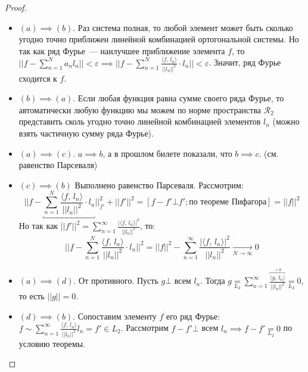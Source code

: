\begin{proof}~
    \begin{itemize}
        \item $(a) \implies (b)$. Раз система полная, то любой элемент может быть сколько угодно точно приближен линейной комбинацией ортогональной системы. Но так как ряд Фурье~--- наилучшее приближение элемента $f$, то $\lvert \lvert f - \sum_{n=1}^N a_n l_n \rvert \rvert < \varepsilon \implies \lvert \lvert f - \sum_{n=1}^N \frac{\langle f,\, l_n \rangle}{\lvert \lvert l_n \rvert \rvert^2} \cdot l_n \rvert \rvert < \varepsilon$. Значит, ряд Фурье сходится к $f$.
        \item $(b) \implies (a)$. Если любая функция равна сумме своего ряда Фурье, то автоматически любую функцию мы можем по норме пространства $\mathcal{R}_2$ представить сколь угодно точно линейной комбинацией элементов $l_n$ (можно взять частичную сумму ряда Фурье).
        \item $(a) \implies (c)$. $a \implies b$, а в прошлом билете показали, что $b \implies c$. (см. равенство Парсеваля)
        \item $(c) \implies (b)$ Выполнено равенство Парсеваля. Рассмотрим:
        \[\lvert \lvert f - \underbracket{\sum_{n=1}^N \frac{\langle f,\, l_n \rangle}{\lvert \lvert l_n \rvert \rvert^2} \cdot l_n} \rvert \rvert^2_{f'} + \lvert \lvert f' \rvert \rvert^2 = [f - f' \bot f'; \text{по теореме Пифагора}] = \lvert \lvert f \rvert \rvert^2\]
        Но так как $\lvert \lvert f' \rvert \rvert^2 = \sum_{n=1}^\infty \frac{\lvert \langle f,\, l_n \rangle\rvert^2}{\lvert \lvert l_n \rvert \rvert^2}$, то:
        \[\lvert \lvert f - \sum_{n=1}^N \frac{\langle f,\, l_n \rangle}{\lvert \lvert l_n \rvert \rvert^2} \cdot l_n \rvert \rvert^2 = \lvert \lvert f \rvert \rvert^2 - \sum_{n=1}^\infty \frac{\lvert \langle f,\, l_n \rangle\rvert^2}{\lvert \lvert l_n \rvert \rvert^2} \xrightarrow[N \to \infty]{} 0\]
        \item $(a) \implies (d)$. От противного. Пусть $g \bot $ всем $l_n$. Тогда $g \underset{L_2}{=}  \sum_{n=1}^\infty \frac{ \overbracket{\langle g,\, l_n \rangle}^{=0}}{\lvert \lvert l_n \rvert \rvert^2} \underset{L_2}{=} 0$, то есть $\lvert \lvert g\rvert \rvert = 0$.
        \item $(d) \implies (b)$. Сопоставим элементу $f$ его ряд Фурье: $f \sim \sum_{n=1}^\infty \frac{\langle f,\, l_n \rangle}{\lvert \lvert l_n \rvert \rvert^2} l_n = f' \in L_2$.
        Рассмотрим $f - f' \bot$ всем $l_n \implies f - f' \underset{L_2}{=} 0$ по условию теоремы.
    \end{itemize}
\end{proof}